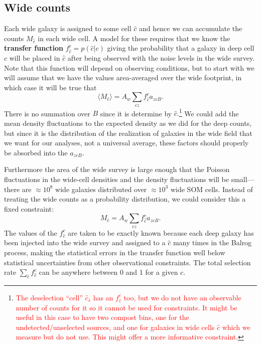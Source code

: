 \documentclass[11pt,preprint,flushrt]{aastex631}
\begin{document}
\subsection{Wide counts}
Each wide galaxy is assigned to some cell $\hat c$ and hence we can
accumulate the counts $M_{\hat c}$ in each wide cell.  A model for
these requires that we know the \textbf{transfer function} $f_{\hat
  c}^c = p(\hat c | c)$ giving the probability that a galaxy in deep
cell $c$ will be placed in $\hat c$ after being observed with the
noise levels in the wide survey.  Note that this function will depend
on observing conditions, but to start with we will assume that we have
the values area-averaged over the wide footprint, in which case it
will be true that
\begin{equation}
  \langle M_{\hat c} \rangle = A_w \sum_{cz} f^c_{\hat c} a_{zcB}.
\end{equation}
There is no summation over $B$ since it is determine by $\hat
c.$\footnote{\textcolor{red}
{The deselection ``cell''  $\hat c_{\bar s}$ has an $f^c_{\hat c}$
  too, but we do not have an observable number of counts for it so it
  cannot be used for constraints.  It might be useful in this case to
  have two compost bins, one for the undetected/unselected sources,
  and one for galaxies in wide cells $\hat c$ which we measure but do
  not use.  This might offer a more informative constraint.}}  We
could add the mean density fluctuations to the expected density as we
did for the deep counts, but since it is the distribution of
the realization of galaxies in the wide field that we want for our
analyses, not a universal average, these factors should properly be
absorbed into the $a_{zcB}.$

Furthermore the area of the wide survey is large enough that the
Poisson fluctuations in the wide-cell densities and the density fluctuations
will be small---there are $\approx 10^8$ wide galaxies distributed
over $\approx 10^3$ wide SOM cells.  Instead of treating the wide
counts as a probability distribution, we could consider this a fixed
constraint:
\begin{equation}
 M_{\hat c} = A_w \sum_{cz} f^c_{\hat c} a_{zcB}.
\label{wideconstraint}
\end{equation}
The values of the $f^c_{\hat c}$ are taken to be exactly known because
each deep galaxy has been injected into the wide survey and assigned
to a $\hat c$ many times in the Balrog process, making the statistical
errors in the transfer function well below statistical uncertainties
from other observational constraints.  The total selection rate
$\sum_{\hat c} f^c_{\hat c}$ can be anywhere between 0 and 1 for a
given $c$.
\end{document}
